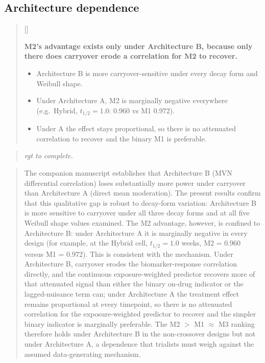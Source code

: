 \documentclass[
  11pt,
]{article}
\newcounter{pgraph}
\newenvironment{bullets}{%
  \stepcounter{pgraph}%
  \begin{quote}\small\sffamily\color[gray]{0.30}%
  {\normalfont\scriptsize\color[gray]{0.58}[\thepgraph]\enspace}}{%
  \end{quote}}
\newenvironment{rgt}{%
  \begin{quote}\small\itshape\color[RGB]{20,60,160}}{%
  \end{quote}}
\newenvironment{orig}{%
  \begin{quote}\normalsize\color[gray]{0.55}}{%
  \end{quote}}
\begin{document}
\subsection{Architecture dependence}\label{architecture-dependence}

\begin{bullets}

\textbf{M2's advantage exists only under Architecture B, because
only there does carryover erode a correlation for M2 to recover.}

\begin{itemize}\setlength{\itemsep}{2pt}\setlength{\parskip}{0pt}
\item Architecture B is more carryover-sensitive under every decay
form and Weibull shape.
\item Under Architecture A, M2 is marginally negative everywhere
(e.g.\ Hybrid, $t_{1/2} = 1.0$: 0.960 vs M1 0.972).
\item Under A the effect stays proportional, so there is no
attenuated correlation to recover and the binary M1 is preferable.
\end{itemize}

\end{bullets}

\begin{rgt}
rgt to complete.

\end{rgt}

\begin{orig}
The companion manuscript establishes that Architecture B (MVN
differential correlation) loses substantially more power under
carryover than Architecture A (direct mean moderation). The
present results confirm that this qualitative gap is robust to
decay-form variation: Architecture B is more sensitive to
carryover under all three decay forms and at all five Weibull
shape values examined. The M2 advantage, however, is confined to
Architecture B: under Architecture A it is marginally negative in
every design (for example, at the Hybrid cell, \(t_{1/2} = 1.0\)
weeks, M2 = 0.960 versus M1 = 0.972). This is consistent with the
mechanism. Under Architecture B, carryover erodes the
biomarker-response correlation directly, and the continuous
exposure-weighted predictor recovers more of that attenuated
signal than either the binary on-drug indicator or the
lagged-nuisance term can; under Architecture A the treatment
effect remains proportional at every timepoint, so there is no
attenuated correlation for the exposure-weighted predictor to
recover and the simpler binary indicator is marginally preferable.
The M2 \(>\) M1 \(\approx\) M3 ranking therefore holds under
Architecture B in the non-crossover designs but not under
Architecture A, a dependence that trialists must weigh against the
assumed data-generating mechanism.

\end{orig}
\end{document}
